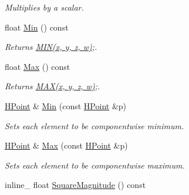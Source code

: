 \begin{DoxyCompactItemize}
\begin{DoxyCompactList}\small\item\em Multiplies by a scalar. \end{DoxyCompactList}\item 
\hypertarget{class_h_point_a5a24f3c82f145ed4ca6a194143cd0f01}{float \hyperlink{class_h_point_a5a24f3c82f145ed4ca6a194143cd0f01}{Min} () const }\label{class_h_point_a5a24f3c82f145ed4ca6a194143cd0f01}

\begin{DoxyCompactList}\small\item\em Returns \hyperlink{_ice_types_8h_a3acffbd305ee72dcd4593c0d8af64a4f}{M\+I\+N(x, y, z, w)};. \end{DoxyCompactList}\item 
\hypertarget{class_h_point_ae6d05272997559325b6d77fca17949c5}{float \hyperlink{class_h_point_ae6d05272997559325b6d77fca17949c5}{Max} () const }\label{class_h_point_ae6d05272997559325b6d77fca17949c5}

\begin{DoxyCompactList}\small\item\em Returns \hyperlink{_ice_types_8h_afa99ec4acc4ecb2dc3c2d05da15d0e3f}{M\+A\+X(x, y, z, w)};. \end{DoxyCompactList}\item 
\hypertarget{class_h_point_af2cbee07c1867886df792470100bf397}{\hyperlink{class_h_point}{H\+Point} \& \hyperlink{class_h_point_af2cbee07c1867886df792470100bf397}{Min} (const \hyperlink{class_h_point}{H\+Point} \&p)}\label{class_h_point_af2cbee07c1867886df792470100bf397}

\begin{DoxyCompactList}\small\item\em Sets each element to be componentwise minimum. \end{DoxyCompactList}\item 
\hypertarget{class_h_point_a8ce5b1d87b642e766df8848bd2ef8e5d}{\hyperlink{class_h_point}{H\+Point} \& \hyperlink{class_h_point_a8ce5b1d87b642e766df8848bd2ef8e5d}{Max} (const \hyperlink{class_h_point}{H\+Point} \&p)}\label{class_h_point_a8ce5b1d87b642e766df8848bd2ef8e5d}

\begin{DoxyCompactList}\small\item\em Sets each element to be componentwise maximum. \end{DoxyCompactList}\item 
\hypertarget{class_h_point_a9dfac3b4c726f5371a6e005d4586b6df}{inline\+\_\+ float \hyperlink{class_h_point_a9dfac3b4c726f5371a6e005d4586b6df}{Square\+Magnitude} () const }\label{class_h_point_a9dfac3b4c726f5371a6e005d4586b6df}


\end{DoxyCompactItemize}

